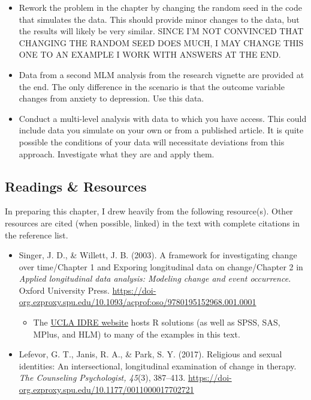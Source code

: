 \documentclass[
  11pt,
]{book}
\providecommand{\tightlist}{%
  \setlength{\itemsep}{0pt}\setlength{\parskip}{0pt}}
\begin{document}
\begin{itemize}
\tightlist
\item
  Rework the problem in the chapter by changing the random seed in the code that simulates the data. This should provide minor changes to the data, but the results will likely be very similar. SINCE I'M NOT CONVINCED THAT CHANGING THE RANDOM SEED DOES MUCH, I MAY CHANGE THIS ONE TO AN EXAMPLE I WORK WITH ANSWERS AT THE END.
\item
  Data from a second MLM analysis from the research vignette are provided at the end. The only difference in the scenario is that the outcome variable changes from anxiety to depression. Use this data.
\item
  Conduct a multi-level analysis with data to which you have access. This could include data you simulate on your own or from a published article. It is quite possible the conditions of your data will necessitate deviations from this approach. Investigate what they are and apply them.
\end{itemize}

\hypertarget{readings-resources-1}{%
\subsection{Readings \& Resources}\label{readings-resources-1}}

In preparing this chapter, I drew heavily from the following resource(s). Other resources are cited (when possible, linked) in the text with complete citations in the reference list.

\begin{itemize}
\tightlist
\item
  Singer, J. D., \& Willett, J. B. (2003). A framework for investigating change over time/Chapter 1 and Exporing longitudinal data on change/Chapter 2 in \emph{Applied longitudinal data analysis: Modeling change and event occurrence.} Oxford University Press. \url{https://doi-org.ezproxy.spu.edu/10.1093/acprof:oso/9780195152968.001.0001}

  \begin{itemize}
  \tightlist
  \item
    The \href{https://stats.idre.ucla.edu/other/examples/alda/}{UCLA IDRE website} hosts R solutions (as well as SPSS, SAS, MPlus, and HLM) to many of the examples in this text.
  \end{itemize}
\item
  Lefevor, G. T., Janis, R. A., \& Park, S. Y. (2017). Religious and sexual identities: An intersectional, longitudinal examination of change in therapy. \emph{The Counseling Psychologist, 45}(3), 387--413. \url{https://doi-org.ezproxy.spu.edu/10.1177/0011000017702721}
\end{itemize}
\end{document}
